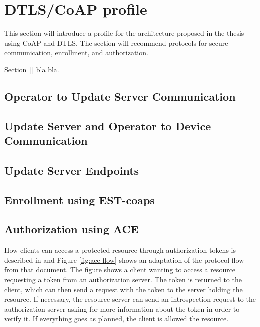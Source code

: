 \documentclass[0-thesis.tex]{subfiles}
\begin{document}
\label{chap:profiles}

\section{DTLS/CoAP profile}
\label{sec:dtls-coap-profile}
This section will introduce a profile for the architecture proposed in the thesis using
CoAP and DTLS. The section will recommend protocols for secure communication, enrollment,
and authorization. 

Section~\ref{} bla bla.

\subsection{Operator to Update Server Communication}
\label{ssec:operator-to-update-server}

\subsection{Update Server and Operator to Device Communication}
\label{ssec:update-server-and-operator-to-device}

\subsection{Update Server Endpoints}
\label{ssec:update-server-endpoints}

\subsection{Enrollment using EST-coaps}
\label{ssec:enrollment-est}

\subsection{Authorization using ACE}
\label{ssec:authorization-ace}
How clients can access a protected resource through authorization tokens is described in
\parencite{ace} and Figure \ref{fig:ace-flow} shows an adaptation of the protocol flow
from that document. The figure shows a client wanting to access a resource requesting a
token from an authorization server. The token is returned to the client, which can then
send a request with the token to the server holding the resource. If necessary, the
resource server can send an introspection request to the authorization server asking for
more information about the token in order to verify it. If everything goes as planned, the
client is allowed the resource.
\end{document}
